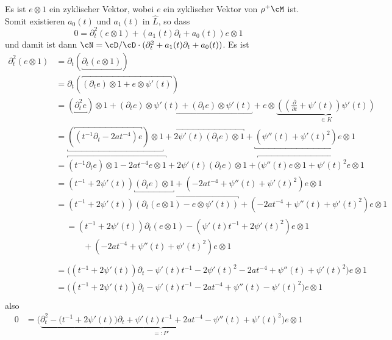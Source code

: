 Es ist $e\otimes 1$ ein zyklischer Vektor, wobei $e$ ein zyklischer Vektor von
$\rho^+\cM$ ist.
Somit existieren $a_0(t)$ und $a_1(t)$ in $\hat L$, so dass
\[
0=\partial_t^2 (e\otimes 1) + (a_1(t)\partial_t + a_0(t)) e\otimes 1
\]
und damit ist dann $\cN=\cD/\cD\cdot(\partial_t^2+a_1(t)\partial_t+a_0(t))$.
Es ist
\begin{align*}
\partial_t^2(e\otimes 1) &=\partial_t(\underbracket{\partial_t(e\otimes 1)})\\
  &= \partial_t(\overbracket{(\partial_te)\otimes 1
    + e\otimes \psi'(t)})\\
  &= (\underbracket{\partial_t^2 e})\otimes 1
    + \underbracket{(\partial_t e)\otimes \psi'(t)
    +               (\partial_t e)\otimes \psi'(t)}
    + e\otimes\underset{\in K}{\underbrace{((\frac{\partial}{\partial t}
    + \psi'(t))\psi'(t))}}\\
  &= \underbracket{(\overbracket{(t^{-1}\partial_t - 2at^{-4}) e})\otimes 1}
    + \overbracket{2\psi'(t) (\partial_t e)\otimes 1}
    + \underbracket{(\psi''(t) + \psi'(t)^2)e\otimes 1}\\
  &= \overbracket{
      (t^{-1}\partial_t e)\otimes 1
      - 2at^{-4} e\otimes 1
    }
    + 2\psi'(t) (\partial_t e)\otimes 1 + \overbracket{
      ( \psi''(t) e\otimes 1
      + \psi'(t)^2 e\otimes 1
    }\\
  &= (t^{-1} + 2\psi'(t)) \underbracket{(\partial_t e)\otimes 1}
    + (- 2at^{-4} + \psi''(t) + \psi'(t)^2) e\otimes 1 \\
  &= (t^{-1} + 2\psi'(t))\overbracket{(\partial_t (e\otimes 1)
    - e\otimes \psi'(t))}+ (- 2at^{-4} + \psi''(t) + \psi'(t)^2) e\otimes 1 \\
  &\begin{aligned}
    &= (t^{-1} + 2\psi'(t))\partial_t (e\otimes 1)
    - (\psi'(t) t^{-1} + 2\psi'(t)^2)e\otimes 1\\
    &\qquad + (- 2at^{-4} + \psi''(t) + \psi'(t)^2) e\otimes 1 \\
  \end{aligned} \\
  &= \Big((t^{-1} + 2\psi'(t))\partial_t
    - \psi'(t) t^{-1} - 2\psi'(t)^2 - 2at^{-4} + \psi''(t)
    + \psi'(t)^2\Big) e\otimes 1 \\
  &= \Big((t^{-1} + 2\psi'(t))\partial_t
    - \psi'(t) t^{-1} - 2at^{-4} + \psi''(t)
    - \psi'(t)^2\Big) e\otimes 1\\
\end{align*}
also
\begin{align*}
0 &= \Big( \underset{=:P'}{\underbrace{
    \partial_t^2 - \big(t^{-1} + 2\psi'(t)\big)\partial_t
    + \psi'(t) t^{-1} + 2at^{-4} -\psi''(t)
    + \psi'(t)^2 }} \Big) e\otimes 1
\end{align*}
